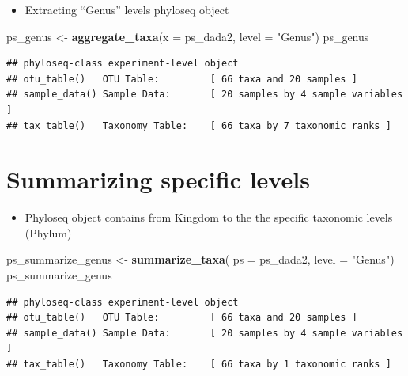 \documentclass[
]{book}
\newenvironment{Shaded}{\begin{snugshade}}{\end{snugshade}}
\newcommand{\AttributeTok}[1]{\textcolor[rgb]{0.13,0.29,0.53}{#1}}
\newcommand{\FunctionTok}[1]{\textcolor[rgb]{0.13,0.29,0.53}{\textbf{#1}}}
\newcommand{\NormalTok}[1]{#1}
\newcommand{\OtherTok}[1]{\textcolor[rgb]{0.56,0.35,0.01}{#1}}
\newcommand{\StringTok}[1]{\textcolor[rgb]{0.31,0.60,0.02}{#1}}
\providecommand{\tightlist}{%
  \setlength{\itemsep}{0pt}\setlength{\parskip}{0pt}}
\begin{document}
\begin{itemize}
\tightlist
\item
  Extracting ``Genus'' levels phyloseq object
\end{itemize}

\begin{Shaded}
\begin{Highlighting}[]
\NormalTok{ps\_genus }\OtherTok{\textless{}{-}} \FunctionTok{aggregate\_taxa}\NormalTok{(}\AttributeTok{x =}\NormalTok{ ps\_dada2, }
                           \AttributeTok{level =} \StringTok{"Genus"}\NormalTok{)}
\NormalTok{ps\_genus}
\end{Highlighting}
\end{Shaded}

\begin{verbatim}
## phyloseq-class experiment-level object
## otu_table()   OTU Table:         [ 66 taxa and 20 samples ]
## sample_data() Sample Data:       [ 20 samples by 4 sample variables ]
## tax_table()   Taxonomy Table:    [ 66 taxa by 7 taxonomic ranks ]
\end{verbatim}

\hypertarget{summarizing-specific-levels}{%
\section{Summarizing specific levels}\label{summarizing-specific-levels}}

\begin{itemize}
\tightlist
\item
  Phyloseq object contains from Kingdom to the the specific taxonomic levels (Phylum)
\end{itemize}

\begin{Shaded}
\begin{Highlighting}[]
\NormalTok{ps\_summarize\_genus }\OtherTok{\textless{}{-}} \FunctionTok{summarize\_taxa}\NormalTok{(}
    \AttributeTok{ps =}\NormalTok{ ps\_dada2, }
    \AttributeTok{level =} \StringTok{"Genus"}\NormalTok{)}
\NormalTok{ps\_summarize\_genus}
\end{Highlighting}
\end{Shaded}

\begin{verbatim}
## phyloseq-class experiment-level object
## otu_table()   OTU Table:         [ 66 taxa and 20 samples ]
## sample_data() Sample Data:       [ 20 samples by 4 sample variables ]
## tax_table()   Taxonomy Table:    [ 66 taxa by 1 taxonomic ranks ]
\end{verbatim}
\end{document}

